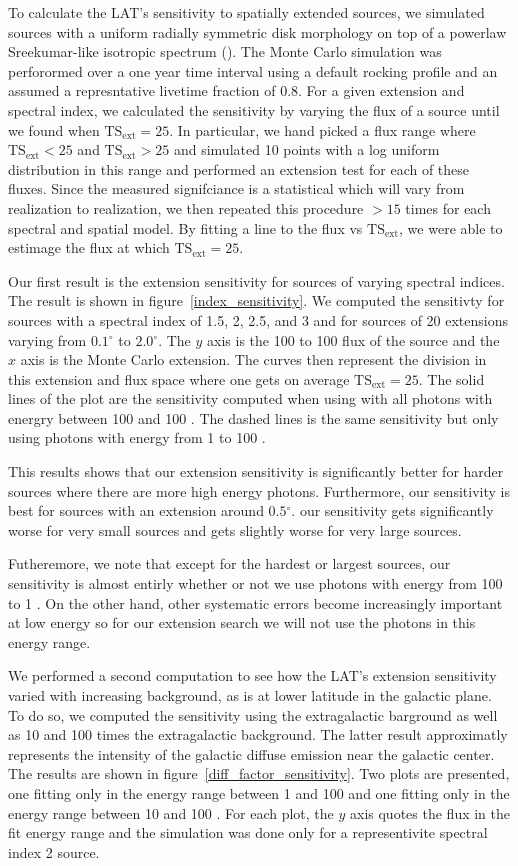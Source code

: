 \documentclass[preprint]{aastex}
\newcommand{\mev}{\text{MeV}\xspace}
\newcommand{\gev}{\text{GeV}\xspace}
\newcommand{\tsext}{{\ensuremath{\text{TS}_\text{ext}}}\xspace}
\renewcommand{\deg}{\ensuremath{^\circ}\xspace}
\begin{document}
To calculate the LAT's sensitivity to spatially extended sources,
we simulated sources with a uniform radially symmetric
disk morphology on top of a powerlaw Sreekumar-like isotropic
spectrum (\cite{sreekumar_isotropic}).  The Monte Carlo
simulation was perforormed over a one year time interval using a default
rocking profile and an assumed a represntative livetime fraction of 0.8.
For a given extension and spectral index, we calculated the
sensitivity by varying the flux of a source until we found 
when $\tsext=25$. In particular, we hand picked a flux range
where $\tsext<25$ and $\tsext>25$ and simulated 10 points with
a log uniform distribution in this range and performed an extension
test for each of these fluxes. Since the measured signifciance is
a statistical which will vary from realization to realization,
we then repeated this procedure $>15$ times for each spectral
and spatial model.
By fitting a line to the flux vs $\tsext$, we were able to
estimage the flux at which $\tsext=25$.

Our first result is the extension sensitivity for sources of varying
spectral indices. The result is shown in figure~\ref{index_sensitivity}.
We computed the sensitivty for sources with a spectral index of 1.5,
2, 2.5, and 3 and for sources of 20 extensions varying from $0.1\deg$
to $2.0\deg$. The $y$ axis is the 100 \mev to 100 \gev flux of the
source and the $x$ axis is the Monte Carlo extension. The curves then
represent the division in this extension and flux space where one gets
on average $\tsext=25$.
The solid lines of the plot are the sensitivity computed when using
with all photons with energry between 100 \mev and 100 \gev. The dashed lines is the
same sensitivity but only using photons with energy from 1 \gev to 100 \gev.

This results shows that our extension sensitivity is
significantly better for harder sources where there are more high
energy photons. Furthermore, our sensitivity is best for sources with an
extension around $0.5\deg$.  our sensitivity gets significantly worse
for very small sources and gets slightly worse for very large sources.

Futheremore, we note that except for the hardest or largest sources,
our sensitivity is almost entirly whether or not we use photons 
with energy from
100 \mev to 1 \gev. On the other hand, other systematic errors become
increasingly important at low energy so for our extension search we will
not use the photons in this energy range.

We performed a second computation to see how the LAT's extension
sensitivity varied with increasing background, as is at lower latitude
in the galactic plane. To do so, we computed the sensitivity using the
extragalactic barground as well as 10 and 100 times the extragalactic
background. The latter result approximatly represents the intensity of
the galactic diffuse emission near the galactic center. The results are
shown in figure~\ref{diff_factor_sensitivity}. Two plots are presented,
one fitting only in the energy range between 1 \gev and 100 \gev and
one fitting only in the energy range between 10 \gev and 100 \gev. For
each plot, the $y$ axis quotes the flux in the fit energy range and the
simulation was done only for a representivite spectral index 2 source.
\end{document}
